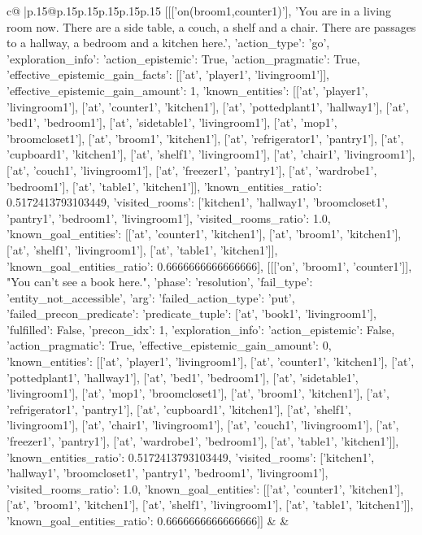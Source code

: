 \documentclass{article}
\begin{document}
{\begin{supertabular}{c@{$\;$}|p{.15\linewidth}@{}p{.15\linewidth}p{.15\linewidth}p{.15\linewidth}p{.15\linewidth}p{.15\linewidth}}
{{{	 [[['on(broom1,counter1)'], 'You are in a living room now. There are a side table, a couch, a shelf and a chair. There are passages to a hallway, a bedroom and a kitchen here.', {'action_type': 'go', 'exploration_info': {'action_epistemic': True, 'action_pragmatic': True, 'effective_epistemic_gain_facts': [['at', 'player1', 'livingroom1']], 'effective_epistemic_gain_amount': 1, 'known_entities': [['at', 'player1', 'livingroom1'], ['at', 'counter1', 'kitchen1'], ['at', 'pottedplant1', 'hallway1'], ['at', 'bed1', 'bedroom1'], ['at', 'sidetable1', 'livingroom1'], ['at', 'mop1', 'broomcloset1'], ['at', 'broom1', 'kitchen1'], ['at', 'refrigerator1', 'pantry1'], ['at', 'cupboard1', 'kitchen1'], ['at', 'shelf1', 'livingroom1'], ['at', 'chair1', 'livingroom1'], ['at', 'couch1', 'livingroom1'], ['at', 'freezer1', 'pantry1'], ['at', 'wardrobe1', 'bedroom1'], ['at', 'table1', 'kitchen1']], 'known_entities_ratio': 0.5172413793103449, 'visited_rooms': ['kitchen1', 'hallway1', 'broomcloset1', 'pantry1', 'bedroom1', 'livingroom1'], 'visited_rooms_ratio': 1.0, 'known_goal_entities': [['at', 'counter1', 'kitchen1'], ['at', 'broom1', 'kitchen1'], ['at', 'shelf1', 'livingroom1'], ['at', 'table1', 'kitchen1']], 'known_goal_entities_ratio': 0.6666666666666666}}], [[['on', 'broom1', 'counter1']], "You can't see a book here.", {'phase': 'resolution', 'fail_type': 'entity_not_accessible', 'arg': {'failed_action_type': 'put', 'failed_precon_predicate': {'predicate_tuple': ['at', 'book1', 'livingroom1'], 'fulfilled': False, 'precon_idx': 1}}, 'exploration_info': {'action_epistemic': False, 'action_pragmatic': True, 'effective_epistemic_gain_amount': 0, 'known_entities': [['at', 'player1', 'livingroom1'], ['at', 'counter1', 'kitchen1'], ['at', 'pottedplant1', 'hallway1'], ['at', 'bed1', 'bedroom1'], ['at', 'sidetable1', 'livingroom1'], ['at', 'mop1', 'broomcloset1'], ['at', 'broom1', 'kitchen1'], ['at', 'refrigerator1', 'pantry1'], ['at', 'cupboard1', 'kitchen1'], ['at', 'shelf1', 'livingroom1'], ['at', 'chair1', 'livingroom1'], ['at', 'couch1', 'livingroom1'], ['at', 'freezer1', 'pantry1'], ['at', 'wardrobe1', 'bedroom1'], ['at', 'table1', 'kitchen1']], 'known_entities_ratio': 0.5172413793103449, 'visited_rooms': ['kitchen1', 'hallway1', 'broomcloset1', 'pantry1', 'bedroom1', 'livingroom1'], 'visited_rooms_ratio': 1.0, 'known_goal_entities': [['at', 'counter1', 'kitchen1'], ['at', 'broom1', 'kitchen1'], ['at', 'shelf1', 'livingroom1'], ['at', 'table1', 'kitchen1']], 'known_goal_entities_ratio': 0.6666666666666666}}]] 
	  } 
	   } 
	   } 
	 & & \\ 
 


\end{supertabular}}
\end{document}
